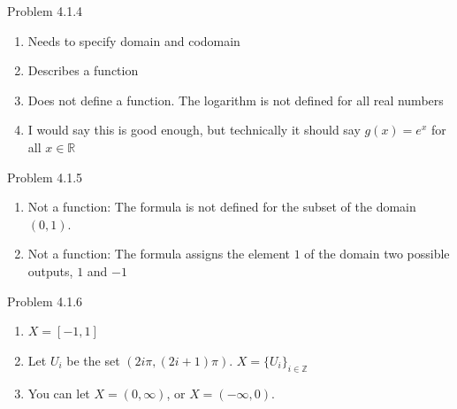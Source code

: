 \documentclass{article}
\theoremstyle{definition}
\newcommand{\R}{\mathbb{R}}
\newcommand{\Z}{\mathbb{Z}}
\begin{document}
	\vspace{1cm}




	\noindent Problem 4.1.4  \vspace{0.3cm}

	\begin{enumerate}
		\item Needs to specify domain and codomain
		\item Describes a function
		\item Does not define a function. The logarithm is not defined for
		all real numbers
		\item I would say this is good enough, but technically it should say
		$g(x)=e^x$ for all $x\in\R$
	\end{enumerate}

	\vspace{1cm}



	\noindent Problem 4.1.5  \vspace{0.3cm}

	\begin{enumerate}
		\item[5] Not a function: The formula is not defined for the subset
		of the domain $(0,1)$.
		\item[6] Not a function: The formula assigns the element $1$ of the
		domain two possible outputs, $1$ and $-1$
	\end{enumerate}

	\vspace{1cm}


	\noindent Problem 4.1.6  \vspace{0.3cm}

	\begin{enumerate}
		\item[2] $X=[-1,1]$
		\item[3] Let $U_i$ be the set $(2i\pi,(2i+1)\pi)$.
		$X=\{U_i\}_{i\in\Z}$
		\item[4] You can let $X=(0,\infty)$, or $X=(-\infty,0)$.

	\end{enumerate}
\end{document}
